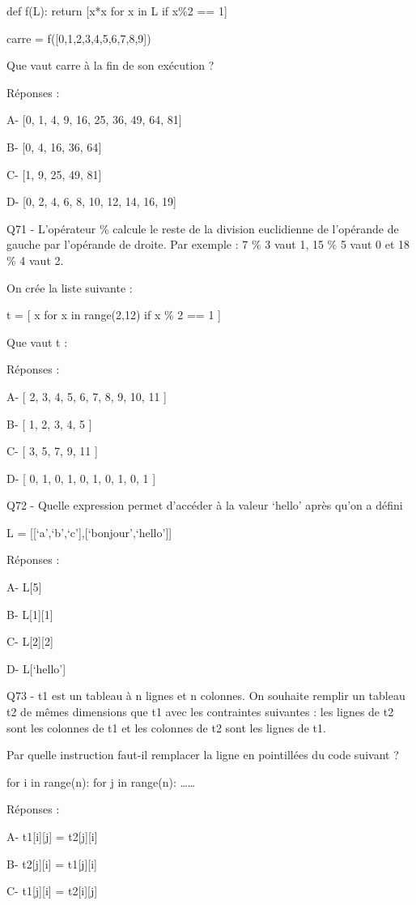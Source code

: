 \documentclass[
]{book}
\begin{document}
def f(L):
return {[}x*x for x in L if x\%2 == 1{]}

carre = f({[}0,1,2,3,4,5,6,7,8,9{]})

Que vaut carre à la fin de son exécution ?

Réponses :

A- {[}0, 1, 4, 9, 16, 25, 36, 49, 64, 81{]}

B- {[}0, 4, 16, 36, 64{]}

C- {[}1, 9, 25, 49, 81{]}

D- {[}0, 2, 4, 6, 8, 10, 12, 14, 16, 19{]}

Q71 - L'opérateur \% calcule le reste de la division euclidienne de l'opérande de gauche par l'opérande de droite. Par exemple : 7 \% 3 vaut 1, 15 \% 5 vaut 0 et 18 \% 4 vaut 2.

On crée la liste suivante :

t = {[} x for x in range(2,12) if x \% 2 == 1 {]}

Que vaut t :

Réponses :

A- {[} 2, 3, 4, 5, 6, 7, 8, 9, 10, 11 {]}

B- {[} 1, 2, 3, 4, 5 {]}

C- {[} 3, 5, 7, 9, 11 {]}

D- {[} 0, 1, 0, 1, 0, 1, 0, 1, 0, 1 {]}

Q72 - Quelle expression permet d'accéder à la valeur `hello' après qu'on a défini

L = {[}{[}`a',`b',`c'{]},{[}`bonjour',`hello'{]}{]}

Réponses :

A- L{[}5{]}

B- L{[}1{]}{[}1{]}

C- L{[}2{]}{[}2{]}

D- L{[}`hello'{]}

Q73 - t1 est un tableau à n lignes et n colonnes. On souhaite remplir un tableau t2 de mêmes dimensions que t1 avec les contraintes suivantes : les lignes de t2 sont les colonnes de t1 et les colonnes de t2 sont les lignes de t1.

Par quelle instruction faut-il remplacer la ligne en pointillées du code suivant ?

for i in range(n):
for j in range(n):
\ldots\ldots{}

Réponses :

A- t1{[}i{]}{[}j{]} = t2{[}j{]}{[}i{]}

B- t2{[}j{]}{[}i{]} = t1{[}j{]}{[}i{]}

C- t1{[}j{]}{[}i{]} = t2{[}i{]}{[}j{]}
\end{document}
